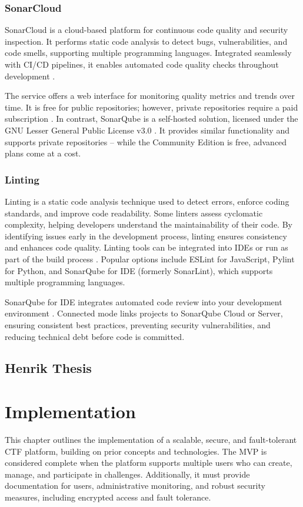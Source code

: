 \subsection{SonarCloud}
SonarCloud is a cloud-based platform for continuous code quality and security inspection. It performs static code analysis to detect bugs, vulnerabilities, and code smells, supporting multiple programming languages. Integrated seamlessly with CI/CD pipelines, it enables automated code quality checks throughout development \Parencite{SonarQubeDocs2025}.

The service offers a web interface for monitoring quality metrics and trends over time. It is free for public repositories; however, private repositories require a paid subscription \Parencite{SonarCloudPricing2025}. In contrast, SonarQube is a self-hosted solution, licensed under the GNU Lesser General Public License v3.0 \Parencite{SonarQubeLicense2025}. It provides similar functionality and supports private repositories -- while the Community Edition is free, advanced plans come at a cost.

\subsection{Linting}
Linting is a static code analysis technique used to detect errors, enforce coding standards, and improve code readability. Some linters assess cyclomatic complexity, helping developers understand the maintainability of their code. By identifying issues early in the development process, linting ensures consistency and enhances code quality. Linting tools can be integrated into IDEs or run as part of the build process \Parencite{SuperLinter2025}. Popular options include ESLint for JavaScript, Pylint for Python, and SonarQube for IDE (formerly SonarLint), which supports multiple programming languages.

SonarQube for IDE integrates automated code review into your development environment \Parencite{SonarQubeConnectedMode2025}. Connected mode links projects to SonarQube Cloud or Server, ensuring consistent best practices, preventing security vulnerabilities, and reducing technical debt before code is committed.

\section{Henrik Thesis}\label{sec:henrik_thesis}


\chapter{Implementation}\label{chap:implementation}
This chapter outlines the implementation of a scalable, secure, and fault-tolerant CTF platform, building on prior concepts and technologies. The MVP is considered complete when the platform supports multiple users who can create, manage, and participate in challenges. Additionally, it must provide documentation for users, administrative monitoring, and robust security measures, including encrypted access and fault tolerance.

